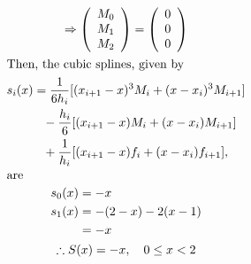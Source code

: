 \documentclass[12pt]{article}
\begin{document}
\begin{gather*}
	\Rightarrow \left( \begin{array}{c}
		M_0 \\
		M_1 \\
		M_2 \\
	\end{array} \right) = 
	\left( \begin{array}{c}
		0 \\
		0 \\
		0 \\
	\end{array} \right) \\
	\intertext{Then, the cubic splines, given by}
	\begin{aligned}
		s_i(x) &= \frac{1}{6h_i} [(x_{i+1} - x)^3 M_i + (x-x_i)^3 M_{i+1}] \\
		&\phantom{=} -\frac{h_i}{6} [(x_{i+1} - x) M_i + (x-x_i) M_{i+1}] \\
		&\phantom{=} +\frac{1}{h_i} [(x_{i+1} - x) f_i + (x-x_i) f_{i+1}],
	\end{aligned} \\
	\shortintertext{are}
	\begin{aligned}
		s_0(x) &= -x \\
		s_1(x) &= -(2 - x) - 2 (x - 1) \\
		&= -x
	\end{aligned} \\
	\therefore S(x) = -x,\quad 0 \le x < 2
\end{gather*}
\end{document}
